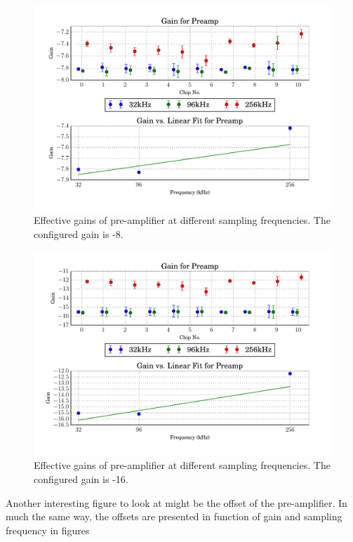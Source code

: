 \begin{figure}
    \centering
    \includegraphics[width=.85\linewidth]{images/plots/dc_slope_preamp_gain-8.pdf}
    \caption{Effective gains of pre-amplifier at different sampling frequencies. The configured gain is -8.}
    \label{fig:preamp_slope-8}
\end{figure}
\begin{figure}
    \centering
    \includegraphics[width=.85\linewidth]{images/plots/dc_slope_preamp_gain-16.pdf}
    \caption{Effective gains of pre-amplifier at different sampling frequencies. The configured gain is -16.}
    \label{fig:preamp_slope-16}
\end{figure}

Another   interesting  figure  to  look  at  might  be  the  offset   of   the
pre-amplifier. In much the same way,  the offsets are presented in function of
gain and sampling frequency in figures

